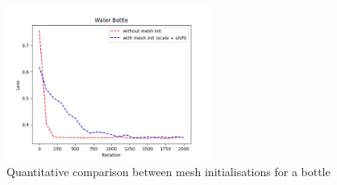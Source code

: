 \documentclass{article}
\begin{document}
\begin{figure}[h!]
  \centering
  \includegraphics[width=0.6\textwidth]{images/bottleplot.png}
  \caption{Quantitative comparison between mesh initialisations for a bottle}
  \label{results-natbottle-loss}
\end{figure}
\end{document}
